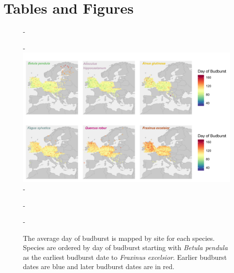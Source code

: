 \documentclass{article}\usepackage[]{graphicx}\usepackage[]{color}
\begin{document}
  
  
  
  
  

%




\section*{Tables and Figures} 

{\begin{figure} [H]
  -\begin{center}
  -\includegraphics[width=14cm]{..//figures/BB_base.png}
  -\caption{The average day of budburst is mapped by site for each species. Species are ordered by day of budburst starting with \textit{Betula pendula} as the earliest budburst date to \textit{Fraxinus excelsior}. Earlier budburst dates are blue and later budburst dates are in red. }\label{fig:bbmap}
  -\end{center}
  -\end{figure}}
  
\end{document}
